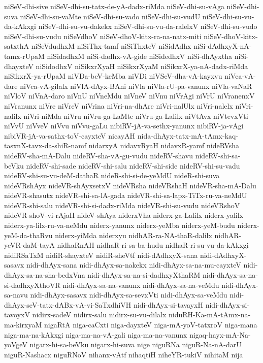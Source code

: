 {niSeV-dhi-sive
niSeV-dhi-su-tatx-de-yA-dadx-riMda
niSeV-dhi-su-vAga
niSeV-dhi-suva
niSeV-dhi-su-vaMte
niSeV-dhi-su-vado
niSeV-dhi-su-vudU
niSeV-dhi-su-vu-da-kAkxgi
niSeV-dhi-su-vu-dakekx
niSeV-dhi-su-vu-da-ralelxV
niSeV-dhi-su-vudo
niSeV-dhi-su-vudu
niSeVdhoV
niSeV-dhoV-kitx-ra-na-natx-miti
niSeV-dhoV-kitx-satxthA
niSeVdudhxM
niSiThx-tamf
niSiThxteV
niSidAdhx
niSi-dAdhxyX-nA-tamx-rUpaM
niSidadhxM
niSi-dadhx-vA-gide
niSidedhxV
niSi-dhAyxtha
niSi-dhayxteV
niSidodhxV
niSikxrXyaH
niSikxrXyaM
niSikxrX-ya-nA-dadx-riMda
niSikxrX-ya-rUpaM
niVDa-beV-keMba
niVDi
niVSeV-dha-vA-kayxvu
niVca-vA-dare
niVca-vA-gilalx
niVlA-dAyx-BAni
niVla
niVla-rU-pa-vanunx
niVla-vaNaR
niVloV
niVnA-daro
niVnU
niVneMdu
niVneV
niVnu
niVrAgi
niVrU
niVranenxV
niVranunx
niVre
niVreV
niVrina
niVri-na-dhAre
niVri-nalUlx
niVri-nalelx
niVri-nalilx
niVri-niMda
niVru
niVru-ga-LaMte
niVru-ga-Lalilx
niVtAvx
niVtevxVti
niVvU
niVveV
niVvu
niVvu-gaLu
nibiRV-jA-va-sethx-yanunx
nibiRV-ja-vAgi
nibiVR-jA-va-sathx-toV-cayxteV
nicayAH
nida-dhAyx-tatx-mA-tAmx-kaq-tasxnX-tavx-da-shiR-namf
nidarxyA
nidavxRyaH
nidavxR-yamf
nideRVsha
nideRV-sha-mA-Dalu
nideRV-sha-vA-gu-vudu
nideRV-shavu
nideRV-shi-sa-beVku
nideRV-shi-sade
nideRV-shi-salu
nideRV-shi-side
nideRV-shi-su-vadu
nideRV-shi-su-vu-deM-dathaR
nideR-shi-si-de-yeMdU
nideR-shi-suva
nideVRshAyx
nideVR-shAyxsetxV
nideVRsha
nideVRshaH
nideVR-sha-mA-Dalu
nideVR-shasutx
nideVR-shi-sa-lA-gada
nideVR-shi-sa-lapx-TiTx-ru-va-neMdU
nideVR-shi-salu
nideVR-shi-si-dadx-riMda
nideVR-shi-su-vudu
nideVRshoV
nideVR-shoV-vi-rAjaH
nideV-shAya
niderxVha
niderx-ga-Lalilx
niderx-yalilx
niderx-ya-lilx-ru-va-neMdu
niderx-yanunx
niderx-yeMba
niderx-yeM-budu
niderx-yeM-da-thaRvu
niderx-yiMda
niderxyu
nidhAR-ra-NA-thaR-dalilx
nidhAR-yeVR-daM-tayA
nidhaRnAH
nidhaR-ri-sa-ba-hudu
nidhaR-ri-su-vu-da-kAkxgi
nidiRSaTxM
nidiR-shayxteV
nidiR-sheVtf
nidi-dAdhxyX-sana
nidi-dAdhxyX-sasavx
nidi-dhAyx-sana
nidi-dhAyx-sa-nakekx
nidi-dhAyx-sa-na-mu-cayxteV
nidi-dhAyx-sa-na-sha-bedxVna
nidi-dhAyx-sa-na-si-dadhxyXthaRM
nidi-dhAyx-sa-na-si-dadhxyXthoVR
nidi-dhAyx-sa-na-vanunx
nidi-dhAyx-sa-na-veMdu
nidi-dhAyx-sa-navu
nidi-dhAyx-sasavx
nidi-dhAyx-sa-sevxVti
nidi-dhAyx-sa-veMdu
nidi-dhAyx-seV-tatx-dABx-vA-vi-SaTxdhiVH
nidi-dhAyx-si-tavayxH
nidi-dhAyx-si-tavoyxV
nidirx-sadeV
nidirx-salu
nidirx-su-vu-dilalx
niduRH-Ka-mA-tAmx-na-ma-kirxyaM
nigaRtA
niga-caCxti
niga-dayxteV
niga-mA-yoV-tatxroV
niga-mana
niga-ma-na-kAkxgi
niga-ma-na-vA-gali
niga-ma-na-vanunx
nigaq-hayx-mA-Na-yoVgeV
nigarx-hi-sa-beVku
nigarx-hi-suva
nige
niguRNa
niguR-Na-nA-darU
niguR-Nashacx
niguRNoV
nihanx-vAtf
nihaqtiH
niheYR-tukiV
nihitaM
nija
}

